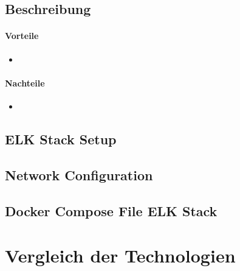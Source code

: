 \subsection{Beschreibung}
\paragraph{Vorteile}
\begin{itemize}
	\item 
\end{itemize}
\paragraph{Nachteile}
\begin{itemize}
	\item 
\end{itemize}

\subsection{ELK Stack Setup}

\subsection{Network Configuration}

\subsection{Docker Compose File ELK Stack}




\section{Vergleich der Technologien}



